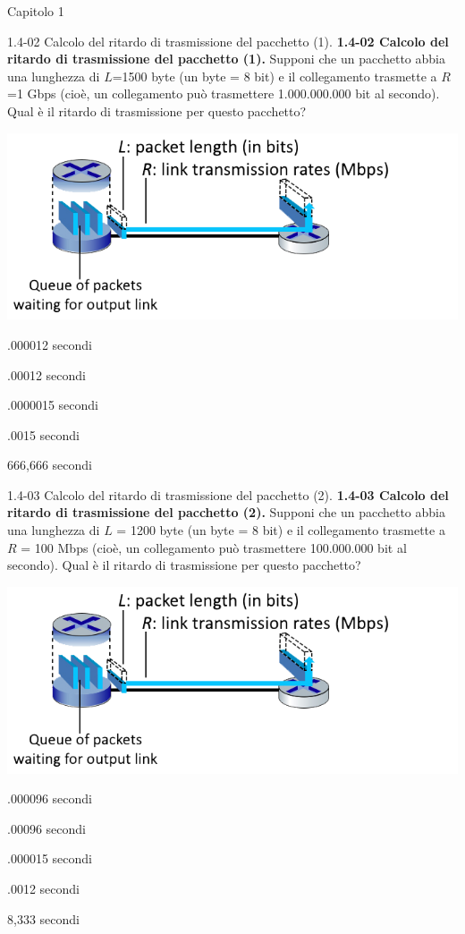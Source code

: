 \documentclass[a4paper]{article}
\begin{document}
\begin{quiz}{Capitolo 1}
\begin{multi}[points=1]{1.4-02 Calcolo del ritardo di trasmissione del pacchetto (1).}
\textbf{1.4-02 Calcolo del ritardo di trasmissione del pacchetto (1).} 
Supponi che un pacchetto abbia una lunghezza di $L$=1500 byte (un byte = 8 bit) e il collegamento trasmette a $R$=1 Gbps (cioè, un collegamento può trasmettere 1.000.000.000 bit al secondo).  
Qual è il ritardo di trasmissione per questo pacchetto?
\begin{center}
\includegraphics[width=\linewidth]{figs/1.4.2.png}
\end{center}
\item* .000012 secondi
\item .00012 secondi
\item .0000015 secondi
\item .0015 secondi
\item 666,666 secondi
\end{multi}

\begin{multi}[points=1]{1.4-03 Calcolo del ritardo di trasmissione del pacchetto (2).}
\textbf{1.4-03 Calcolo del ritardo di trasmissione del pacchetto (2).} 
Supponi che un pacchetto abbia una lunghezza di $L$ = 1200 byte (un byte = 8 bit) e il collegamento trasmette a $R$ = 100 Mbps (cioè, un collegamento può trasmettere 100.000.000 bit al secondo).  Qual è il ritardo di trasmissione per questo pacchetto?
\begin{center}
\includegraphics[width=\linewidth]{figs/1.4.2.png}
\end{center}
\item* .000096 secondi
\item .00096 secondi
\item .000015 secondi
\item .0012 secondi
\item 8,333 secondi
\end{multi}


\end{quiz}
\end{document}
